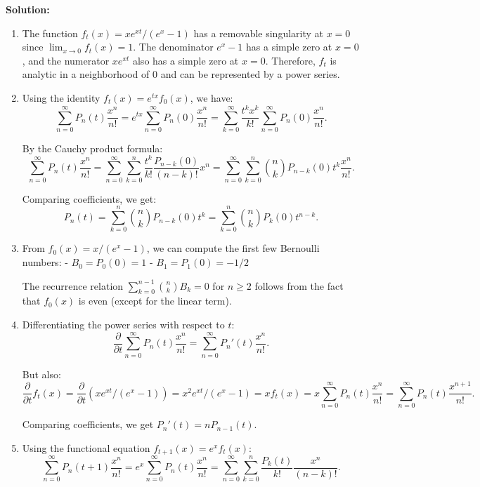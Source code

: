 \bigskip\noindent\textbf{Solution:}
\begin{enumerate}[label=(\alph*)]
\item The function \( f_t(x) = xe^{xt}/(e^x - 1) \) has a removable singularity at \( x = 0 \) since \( \lim_{x \to 0} f_t(x) = 1 \). The denominator \( e^x - 1 \) has a simple zero at \( x = 0 \), and the numerator \( xe^{xt} \) also has a simple zero at \( x = 0 \). Therefore, \( f_t \) is analytic in a neighborhood of 0 and can be represented by a power series.

\item Using the identity \( f_t(x) = e^{tx} f_0(x) \), we have:
\[\sum_{n=0}^\infty P_n(t) \frac{x^n}{n!} = e^{tx} \sum_{n=0}^\infty P_n(0) \frac{x^n}{n!} = \sum_{k=0}^\infty \frac{t^k x^k}{k!} \sum_{n=0}^\infty P_n(0) \frac{x^n}{n!}.\]

By the Cauchy product formula:
\[\sum_{n=0}^\infty P_n(t) \frac{x^n}{n!} = \sum_{n=0}^\infty \sum_{k=0}^n \frac{t^k}{k!} \frac{P_{n-k}(0)}{(n-k)!} x^n = \sum_{n=0}^\infty \sum_{k=0}^n \binom{n}{k} P_{n-k}(0) t^k \frac{x^n}{n!}.\]

Comparing coefficients, we get:
\[P_n(t) = \sum_{k=0}^n \binom{n}{k} P_{n-k}(0) t^k = \sum_{k=0}^n \binom{n}{k} P_k(0) t^{n-k}.\]

\item From \( f_0(x) = x/(e^x - 1) \), we can compute the first few Bernoulli numbers:
- \( B_0 = P_0(0) = 1 \)
- \( B_1 = P_1(0) = -1/2 \)

The recurrence relation \( \sum_{k=0}^{n-1} \binom{n}{k} B_k = 0 \) for \( n \geq 2 \) follows from the fact that \( f_0(x) \) is even (except for the linear term).

\item Differentiating the power series with respect to \( t \):
\[\frac{\partial}{\partial t} \sum_{n=0}^\infty P_n(t) \frac{x^n}{n!} = \sum_{n=0}^\infty P_n'(t) \frac{x^n}{n!}.\]

But also:
\[\frac{\partial}{\partial t} f_t(x) = \frac{\partial}{\partial t} (xe^{xt}/(e^x - 1)) = x^2 e^{xt}/(e^x - 1) = x f_t(x) = x \sum_{n=0}^\infty P_n(t) \frac{x^n}{n!} = \sum_{n=0}^\infty P_n(t) \frac{x^{n+1}}{n!}.\]

Comparing coefficients, we get \( P_n'(t) = nP_{n-1}(t) \).

\item Using the functional equation \( f_{t+1}(x) = e^x f_t(x) \):
\[\sum_{n=0}^\infty P_n(t+1) \frac{x^n}{n!} = e^x \sum_{n=0}^\infty P_n(t) \frac{x^n}{n!} = \sum_{n=0}^\infty \sum_{k=0}^n \frac{P_k(t)}{k!} \frac{x^n}{(n-k)!}.\]


\end{enumerate}
